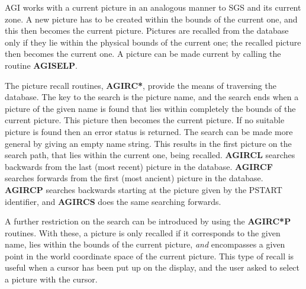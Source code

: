 \documentclass[twoside,11pt]{article}
\newcommand{\htmlref}[2]{#1}
\renewcommand{\_}{\texttt{\symbol{95}}}
\begin{document}
AGI works with a current picture in an analogous manner to SGS and its
current zone.
A new picture has to be created within the bounds of the current one, and this
then becomes the current picture.
Pictures are recalled from the database only if they lie within the physical
bounds of the current one; the recalled picture then becomes the current one.
A picture can be made current by calling the routine 
\htmlref{{\bf AGI\_SELP}}{AGI_SELP}.

The picture recall routines, {\bf AGI\_RC*}, provide the means of traversing
the database.
The key to the search is the picture name, and the search ends when a picture
of the given name is found that lies within completely the bounds of the
current picture. This picture then becomes the current picture.
If no suitable picture is found then an error status is returned.
The search can be made more general by giving an empty name string. This
results in the first picture on the search path, that lies within the current
one, being recalled.
\htmlref{{\bf AGI\_RCL}}{AGI_RCL}
searches backwards from the last (most recent) picture in the database.
\htmlref{{\bf AGI\_RCF}}{AGI_RCF}
searches forwards from the first (most ancient) picture in the database.
\htmlref{{\bf AGI\_RCP}}{AGI_RCP}
searches backwards starting at the picture given by the PSTART
identifier, and \htmlref{{\bf AGI\_RCS}}{AGI_RCS}
does the same searching forwards.

A further restriction on the search can be introduced by using the
{\bf AGI\_RC*P} routines.
With these, a picture is only recalled if it corresponds to the given name,
lies within the bounds of the current picture, {\em and} encompasses a given
point in the world coordinate space of the current picture.
This type of recall is useful when a cursor has been put up on the display,
and the user asked to select a picture with the cursor.
\end{document}
